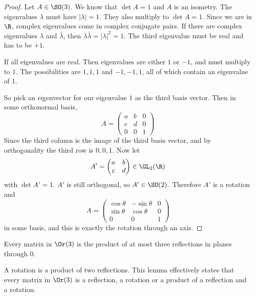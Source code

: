 \documentclass[a4paper]{article}
\begin{document}
\begin{proof}
  Let $A\in \SO(3)$. We know that $\det A = 1$ and $A$ is an isometry. The eigenvalues $\lambda$ must have $|\lambda| = 1$. They also multiply to $\det A = 1$. Since we are in $\R$, complex eigenvalues come in complex conjugate pairs. If there are complex eigenvalues $\lambda$ and $\bar\lambda$, then $\lambda\bar\lambda = |\lambda|^2 = 1$. The third eigenvalue must be real and has to be $+1$.

  If all eigenvalues are real. Then eigenvalues are either $1$ or $-1$, and must multiply to $1$. The possibilities are $1, 1, 1$ and $-1, -1, 1$, all of which contain an eigenvalue of $1$.

  So pick an eigenvector for our eigenvalue $1$ as the third basis vector. Then in some orthonormal basis,
  \[
    A = \begin{pmatrix}
      a & b & 0\\
      c & d & 0\\
      0 & 0 & 1
    \end{pmatrix}
  \]
  Since the third column is the image of the third basis vector, and by orthogonality the third row is $0, 0, 1$. Now let
  \[A' = \begin{pmatrix}
      a & b\\
      c & d
    \end{pmatrix} \in \GL_2(\R)
  \]
  with $\det A' = 1$. $A'$ is still orthogonal, so $A'\in \SO(2)$. Therefore $A'$ is a rotation and
  \[
    A =
    \begin{pmatrix}
      \cos\theta & -\sin\theta & 0\\
      \sin\theta & \cos\theta & 0\\
      0 & 0 & 1
    \end{pmatrix}
  \]
  in some basis, and this is exactly the rotation through an axis.
\end{proof}

\begin{lemma}
  Every matrix in $\Or(3)$ is the product of at most three reflections in planes through 0.
\end{lemma}
\note A rotation is a product of two reflections. This lemma effectively states that every matrix in $\Or(3)$ is a reflection, a rotation or a product of a reflection and a rotation.
\end{document}
